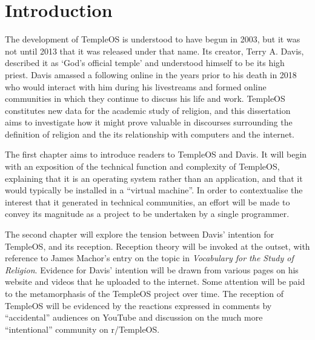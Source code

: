 \documentclass[Draft.tex]{subfiles}
\begin{document}
\chapter*{Introduction}

The development of TempleOS is understood to have begun in 2003,
but it was not until 2013 that it was released under that name.
Its creator, Terry A. Davis, described it as `God's official temple'
and understood himself to be its high priest.
Davis amassed a following online in the years prior to his death in 2018 who
would interact with him during his livestreams and formed online
communities in which they continue to discuss his life and work.
TempleOS constitutes new data for the academic study of religion,
and this dissertation aims to investigate how it might prove valuable
in discourses surrounding the definition of religion
and the its relationship with computers and the internet.


The first chapter aims to introduce readers to TempleOS and Davis.
It will begin with an exposition of the technical function and complexity
of TempleOS, explaining that it is an operating system
rather than an application,
and that it would typically be installed in a ``virtual machine''.
In order to contextualise the interest that it generated
in technical communities, an effort will be made to convey
its magnitude as a project to be undertaken by a single programmer.

The second chapter will explore the tension between
Davis' intention for TempleOS, and its reception.
Reception theory will be invoked at the outset,
with reference to James Machor's entry on the topic in
\textit{Vocabulary for the Study of Religion}.
Evidence for Davis' intention will be drawn from various
pages on his website and videos that he uploaded to the internet.
Some attention will be paid to the metamorphasis of the TempleOS project
over time. The reception of TempleOS will be evidenced by the reactions
expressed in comments by ``accidental'' audiences on YouTube
and discussion on the much more ``intentional'' community on r/TempleOS.
\end{document}
